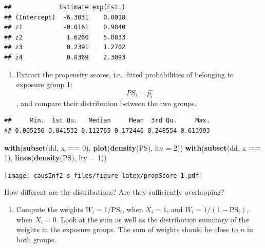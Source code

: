 \documentclass[
]{book}
\newenvironment{Shaded}{\begin{snugshade}}{\end{snugshade}}
\newcommand{\AttributeTok}[1]{\textcolor[rgb]{0.13,0.29,0.53}{#1}}
\newcommand{\DecValTok}[1]{\textcolor[rgb]{0.00,0.00,0.81}{#1}}
\newcommand{\FunctionTok}[1]{\textcolor[rgb]{0.13,0.29,0.53}{\textbf{#1}}}
\newcommand{\NormalTok}[1]{#1}
\newcommand{\OtherTok}[1]{\textcolor[rgb]{0.56,0.35,0.01}{#1}}
\newcommand{\SpecialCharTok}[1]{\textcolor[rgb]{0.81,0.36,0.00}{\textbf{#1}}}
\newcommand{\StringTok}[1]{\textcolor[rgb]{0.31,0.60,0.02}{#1}}
\providecommand{\tightlist}{%
  \setlength{\itemsep}{0pt}\setlength{\parskip}{0pt}}
\begin{document}
\begin{verbatim}
##             Estimate exp(Est.)
## (Intercept)  -6.3031    0.0018
## z1           -0.0161    0.9840
## z2            1.6260    5.0833
## z3            0.2391    1.2702
## z4            0.8369    2.3093
\end{verbatim}

\begin{enumerate}
\def\labelenumi{\arabic{enumi}.}
\setcounter{enumi}{1}
\tightlist
\item
  Extract the propensity scores, i.e.~fitted probabilities of
  belonging to exposure group 1: \[ PS_i = \widehat{p_i} \], and
  compare their distribution between the two groups.
\end{enumerate}

\begin{Shaded}
\end{Shaded}

\begin{verbatim}
##     Min.  1st Qu.   Median     Mean  3rd Qu.     Max. 
## 0.005256 0.041532 0.112765 0.172440 0.248554 0.613993
\end{verbatim}

\begin{Shaded}
\begin{Highlighting}[]
\FunctionTok{with}\NormalTok{(}\FunctionTok{subset}\NormalTok{(dd, x }\SpecialCharTok{==} \DecValTok{0}\NormalTok{), }\FunctionTok{plot}\NormalTok{(}\FunctionTok{density}\NormalTok{(PS), }\AttributeTok{lty =} \DecValTok{2}\NormalTok{))}
\FunctionTok{with}\NormalTok{(}\FunctionTok{subset}\NormalTok{(dd, x }\SpecialCharTok{==} \DecValTok{1}\NormalTok{), }\FunctionTok{lines}\NormalTok{(}\FunctionTok{density}\NormalTok{(PS), }\AttributeTok{lty =} \DecValTok{1}\NormalTok{))}
\end{Highlighting}
\end{Shaded}

\texttt{[image: causInf2-s\_files/figure-latex/propScore-1.pdf]}

How different are the distributions? Are they sufficiently overlapping?

\begin{enumerate}
\def\labelenumi{\arabic{enumi}.}
\setcounter{enumi}{2}
\tightlist
\item
  Compute the weights \(W_i = 1/\text{PS}_i\), when \(X_i=1\), and
  \(W_i = 1/(1-\text{PS}_i)\), when \(X_i=0\). Look at the sum as well as
  the distribution summary of the weights in the exposure groups. The
  sum of weights should be close to \(n\) in both groups.
\end{enumerate}
\end{document}

